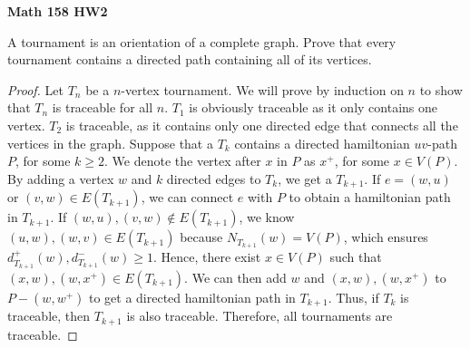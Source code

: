 \documentclass{article}
\newenvironment{problem}[2][Question]{\begin{trivlist}
\item[\hskip \labelsep {\bfseries #1}\hskip \labelsep {\bfseries #2.}]}{\end{trivlist}}
\begin{document}
 

\textbf{Math 158 HW2}

\begin{problem}{2.5.2}
    A tournament is an orientation of a complete graph. Prove that every tournament contains a directed path containing all of its vertices.
\end{problem}
\begin{proof}
    Let $T_n$ be a $n$-vertex tournament. We will prove by induction on $n$ to show that $T_n$ is traceable for all $n$. $T_1$ is obviously traceable as it only contains one vertex. $T_2$ is traceable, as it contains only one directed edge that connects all the vertices in the graph. Suppose that a $T_k$ contains a directed hamiltonian $uv$-path $P$, for some $k \geq 2$. We denote the vertex after $x$ in $P$ as $x^+$, for some $x \in V(P)$. By adding a vertex $w$ and $k$ directed edges to $T_k$, we get a $T_{k+1}$. If $e = (w, u)$ or $(v, w) \in E(T_{k+1})$, we can connect $e$ with $P$ to obtain a hamiltonian path in $T_{k+1}$. If $(w, u), (v, w) \notin E(T_{k+1})$, we know $(u, w), (w, v) \in E(T_{k+1})$ because $N_{T_{k+1}}(w) = V(P)$, which ensures $d_{T_{k+1}}^+(w), d_{T_{k+1}}^-(w) \geq 1$. Hence, there exist $x \in V(P)$ such that $(x, w), (w, x^+) \in E(T_{k+1})$. We can then add $w$ and $(x, w), (w, x^+)$ to $P - (w, w^+)$ to get a directed hamiltonian path in $T_{k+1}$. Thus,
    if $T_k$ is traceable, then $T_{k+1}$ is also traceable. Therefore, all tournaments are traceable.
\end{proof}

\newpage
\end{document}
